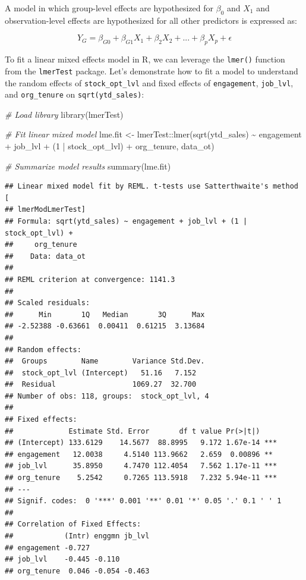 \documentclass[
]{book}
\newenvironment{Shaded}{\begin{snugshade}}{\end{snugshade}}
\newcommand{\CommentTok}[1]{\textcolor[rgb]{0.56,0.35,0.01}{\textit{#1}}}
\newcommand{\DecValTok}[1]{\textcolor[rgb]{0.00,0.00,0.81}{#1}}
\newcommand{\FunctionTok}[1]{\textcolor[rgb]{0.00,0.00,0.00}{#1}}
\newcommand{\NormalTok}[1]{#1}
\newcommand{\OtherTok}[1]{\textcolor[rgb]{0.56,0.35,0.01}{#1}}
\newcommand{\SpecialCharTok}[1]{\textcolor[rgb]{0.00,0.00,0.00}{#1}}
\begin{document}
A model in which group-level effects are hypothesized for \(\beta_0\) and \(X_1\) and observation-level effects are hypothesized for all other predictors is expressed as:

\[ Y_G = \beta_{G0} + \beta_{G1} X_1 + \beta_2 X_2 + {...} + \beta_p X_p + \epsilon \]

To fit a linear mixed effects model in R, we can leverage the \texttt{lmer()} function from the \texttt{lmerTest} package. Let's demonstrate how to fit a model to understand the random effects of \texttt{stock\_opt\_lvl} and fixed effects of \texttt{engagement}, \texttt{job\_lvl}, and \texttt{org\_tenure} on \texttt{sqrt(ytd\_sales)}:

\begin{Shaded}
\begin{Highlighting}[]
\CommentTok{\# Load library}
\FunctionTok{library}\NormalTok{(lmerTest)}

\CommentTok{\# Fit linear mixed model}
\NormalTok{lme.fit }\OtherTok{\textless{}{-}}\NormalTok{ lmerTest}\SpecialCharTok{::}\FunctionTok{lmer}\NormalTok{(}\FunctionTok{sqrt}\NormalTok{(ytd\_sales) }\SpecialCharTok{\textasciitilde{}}\NormalTok{ engagement }\SpecialCharTok{+}\NormalTok{ job\_lvl }\SpecialCharTok{+}\NormalTok{ (}\DecValTok{1} \SpecialCharTok{|}\NormalTok{ stock\_opt\_lvl) }\SpecialCharTok{+}\NormalTok{ org\_tenure, data\_ot)}

\CommentTok{\# Summarize model results}
\FunctionTok{summary}\NormalTok{(lme.fit)}
\end{Highlighting}
\end{Shaded}

\begin{verbatim}
## Linear mixed model fit by REML. t-tests use Satterthwaite's method [
## lmerModLmerTest]
## Formula: sqrt(ytd_sales) ~ engagement + job_lvl + (1 | stock_opt_lvl) +  
##     org_tenure
##    Data: data_ot
## 
## REML criterion at convergence: 1141.3
## 
## Scaled residuals: 
##      Min       1Q   Median       3Q      Max 
## -2.52388 -0.63661  0.00411  0.61215  3.13684 
## 
## Random effects:
##  Groups        Name        Variance Std.Dev.
##  stock_opt_lvl (Intercept)   51.16   7.152  
##  Residual                  1069.27  32.700  
## Number of obs: 118, groups:  stock_opt_lvl, 4
## 
## Fixed effects:
##             Estimate Std. Error       df t value Pr(>|t|)    
## (Intercept) 133.6129    14.5677  88.8995   9.172 1.67e-14 ***
## engagement   12.0038     4.5140 113.9662   2.659  0.00896 ** 
## job_lvl      35.8950     4.7470 112.4054   7.562 1.17e-11 ***
## org_tenure    5.2542     0.7265 113.5918   7.232 5.94e-11 ***
## ---
## Signif. codes:  0 '***' 0.001 '**' 0.01 '*' 0.05 '.' 0.1 ' ' 1
## 
## Correlation of Fixed Effects:
##            (Intr) enggmn jb_lvl
## engagement -0.727              
## job_lvl    -0.445 -0.110       
## org_tenure  0.046 -0.054 -0.463
\end{verbatim}
\end{document}
